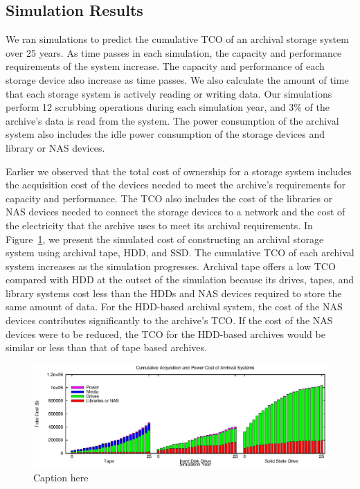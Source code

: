 \subsection{Simulation Results}

We ran simulations to predict the cumulative TCO of an archival storage system over 25 years.  As time passes in each simulation, the capacity and performance requirements of the system increase.  The capacity and performance of each storage device also increase as time passes.  We also calculate the amount of time that each storage system is actively reading or writing data.  Our simulations perform 12 scrubbing operations during each simulation year, and 3\% of the archive's data is read from the system.  The power consumption of the archival system also includes the idle power consumption of the storage devices and library or NAS devices.

Earlier we observed that the total cost of ownership for a storage system includes the acquisition cost of the devices needed to meet the archive's requirements for capacity and performance.  The TCO also includes the cost of the libraries or NAS devices needed to connect the storage devices to a network and the cost of the electricity that the archive uses to meet its archival requirements.  In Figure~\ref{fig1}, we present the simulated cost of constructing an archival storage system using archival tape, HDD, and SSD.  The cumulative TCO of each archival system increases as the simulation progresses.  Archival tape offers a low TCO compared with HDD at the outset of the simulation because its drives, tapes, and library systems cost less than the HDDs and NAS devices required to store the same amount of data.  For the HDD-based archival system, the cost of the NAS devices contributes significantly to the archive's TCO.  If the cost of the NAS devices were to be reduced, the TCO for the HDD-based archives would be similar or less than that of tape based archives.

\begin{figure}[!ht]
\includegraphics[width=\linewidth]{fig1.eps}
\caption{Caption here}
\label{fig1}
\end{figure}

